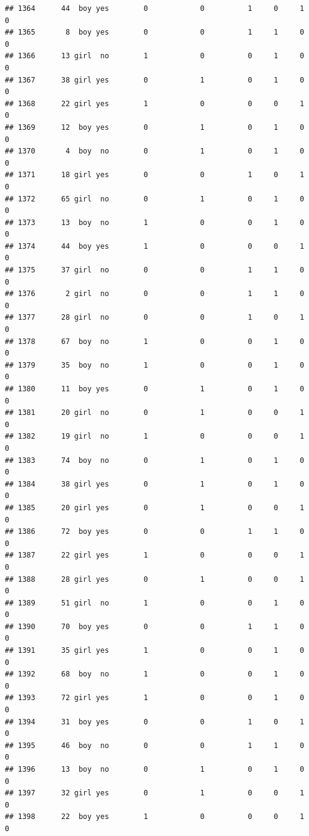 \documentclass[man]{apa6}
\begin{document}
\begin{verbatim}
## 1364      44  boy yes        0            0          1     0     1     0
## 1365       8  boy yes        0            0          1     1     0     0
## 1366      13 girl  no        1            0          0     1     0     0
## 1367      38 girl yes        0            1          0     1     0     0
## 1368      22 girl yes        1            0          0     0     1     0
## 1369      12  boy yes        0            1          0     1     0     0
## 1370       4  boy  no        0            1          0     1     0     0
## 1371      18 girl yes        0            0          1     0     1     0
## 1372      65 girl  no        0            1          0     1     0     0
## 1373      13  boy  no        1            0          0     1     0     0
## 1374      44  boy yes        1            0          0     0     1     0
## 1375      37 girl  no        0            0          1     1     0     0
## 1376       2 girl  no        0            0          1     1     0     0
## 1377      28 girl  no        0            0          1     0     1     0
## 1378      67  boy  no        1            0          0     1     0     0
## 1379      35  boy  no        1            0          0     1     0     0
## 1380      11  boy yes        0            1          0     1     0     0
## 1381      20 girl  no        0            1          0     0     1     0
## 1382      19 girl  no        1            0          0     0     1     0
## 1383      74  boy  no        0            1          0     1     0     0
## 1384      38 girl yes        0            1          0     1     0     0
## 1385      20 girl yes        0            1          0     0     1     0
## 1386      72  boy yes        0            0          1     1     0     0
## 1387      22 girl yes        1            0          0     0     1     0
## 1388      28 girl yes        0            1          0     0     1     0
## 1389      51 girl  no        1            0          0     1     0     0
## 1390      70  boy yes        0            0          1     1     0     0
## 1391      35 girl yes        1            0          0     1     0     0
## 1392      68  boy  no        1            0          0     1     0     0
## 1393      72 girl yes        1            0          0     1     0     0
## 1394      31  boy yes        0            0          1     0     1     0
## 1395      46  boy  no        0            0          1     1     0     0
## 1396      13  boy  no        0            1          0     1     0     0
## 1397      32 girl yes        0            1          0     0     1     0
## 1398      22  boy yes        1            0          0     0     1     0

\end{verbatim}
\end{document}
